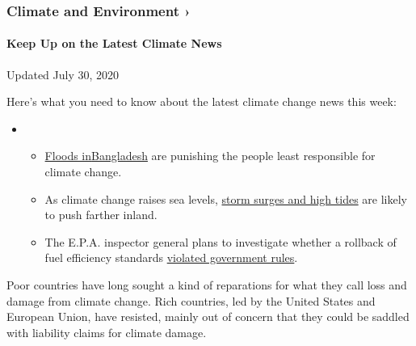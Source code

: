 \href{https://www.nytimes.com/section/climate?action=click\&pgtype=Article\&state=default\&region=MAIN_CONTENT_1\&context=storylines_keepup}{}

\hypertarget{climate-and-environment-}{%
\subsubsection{Climate and Environment
›}\label{climate-and-environment-}}

\hypertarget{keep-up-on-the-latest-climate-news}{%
\paragraph{Keep Up on the Latest Climate
News}\label{keep-up-on-the-latest-climate-news}}

Updated July 30, 2020

Here's what you need to know about the latest climate change news this
week:

\begin{itemize}
\item
  \begin{itemize}
  \tightlist
  \item
    \href{https://www.nytimes.com/2020/07/30/climate/bangladesh-floods.html?action=click\&pgtype=Article\&state=default\&region=MAIN_CONTENT_1\&context=storylines_keepup}{Floods
    in}\href{https://www.nytimes.com/2020/07/30/climate/bangladesh-floods.html?action=click\&pgtype=Article\&state=default\&region=MAIN_CONTENT_1\&context=storylines_keepup}{Bangladesh}
    are punishing the people least responsible for climate change.
  \item
    As climate change raises sea levels,
    \href{https://www.nytimes.com/2020/07/30/climate/sea-level-inland-floods.html?action=click\&pgtype=Article\&state=default\&region=MAIN_CONTENT_1\&context=storylines_keepup}{storm
    surges and high tides} are likely to push farther inland.
  \item
    The E.P.A. inspector general plans to investigate whether a rollback
    of fuel efficiency standards
    \href{https://www.nytimes.com/2020/07/27/climate/trump-fuel-efficiency-rule.html?action=click\&pgtype=Article\&state=default\&region=MAIN_CONTENT_1\&context=storylines_keepup}{violated
    government rules}.
  \end{itemize}
\end{itemize}

Poor countries have long sought a kind of reparations for what they call
loss and damage from climate change. Rich countries, led by the United
States and European Union, have resisted, mainly out of concern that
they could be saddled with liability claims for climate damage.


